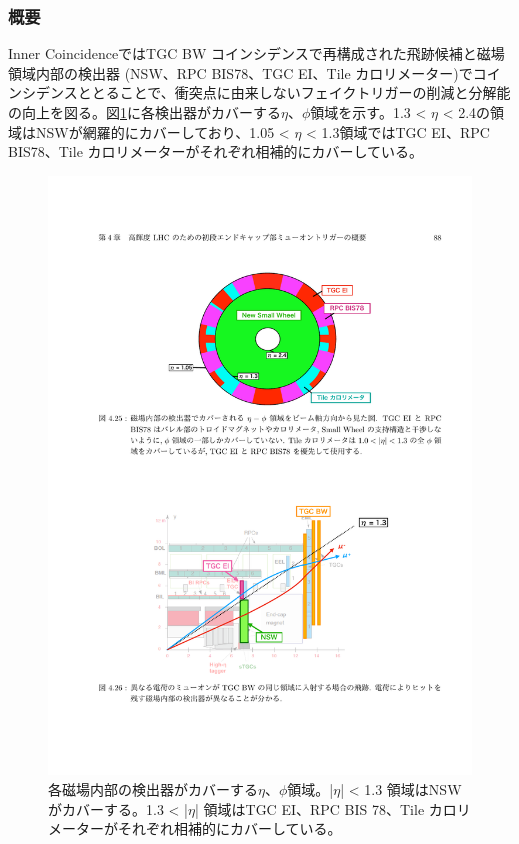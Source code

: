 \subsubsection*{概要}
Inner CoincidenceではTGC BW コインシデンスで再構成された飛跡候補と磁場領域内部の検出器 (NSW、RPC BIS78、TGC EI、Tile カロリメーター)でコインシデンスととることで、衝突点に由来しないフェイクトリガーの削減と\pt 分解能の向上を図る。図\ref{SL_InnerCoin_covarage}に各検出器がカバーする$\eta$、$\phi$領域を示す。1.3 < $\eta$ < 2.4の領域はNSWが網羅的にカバーしており、1.05 < $\eta$ < 1.3領域ではTGC EI、RPC BIS78、Tile カロリメーターがそれぞれ相補的にカバーしている。
\begin{figure} 
    \centering
    \includegraphics[width=16cm]{fig/Intro/SL_InnerCoin_covarage.pdf}
    \caption[磁場内部の検出器でカバーされる$\eta$、$\phi$領域]{各磁場内部の検出器がカバーする$\eta$、$\phi$領域\cite{mt_mino}。|$\eta$| < 1.3 領域はNSWがカバーする。1.3 < |$\eta$| 領域はTGC EI、RPC BIS 78、Tile カロリメーターがそれぞれ相補的にカバーしている。}
    \label{SL_InnerCoin_covarage}
\end{figure}


